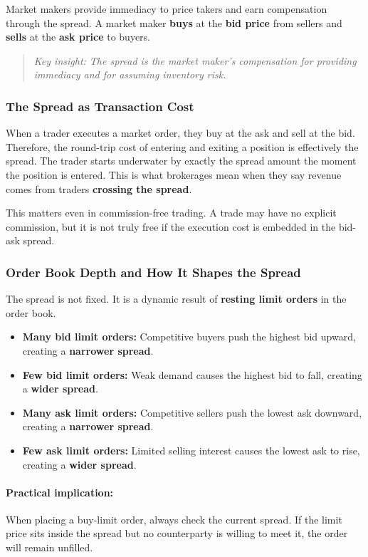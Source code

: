 \documentclass[12pt,openany]{book}
\begin{document}
Market makers provide immediacy to price takers and earn compensation through the spread. A market maker \textbf{buys} at the \textbf{bid price} from sellers and \textbf{sells} at the \textbf{ask price} to buyers.

\begin{quote}
\textit{Key insight: The spread is the market maker's compensation for providing immediacy and for assuming inventory risk.}
\end{quote}

\subsubsection{The Spread as Transaction Cost}
When a trader executes a market order, they buy at the ask and sell at the bid. Therefore, the round-trip cost of entering and exiting a position is effectively the spread. The trader starts underwater by exactly the spread amount the moment the position is entered. This is what brokerages mean when they say revenue comes from traders \textbf{crossing the spread}.

This matters even in commission-free trading. A trade may have no explicit commission, but it is not truly free if the execution cost is embedded in the bid-ask spread.

\subsubsection{Order Book Depth and How It Shapes the Spread}
The spread is not fixed. It is a dynamic result of \textbf{resting limit orders} in the order book.

\begin{itemize}[leftmargin=*]
    \item \textbf{Many bid limit orders:} Competitive buyers push the highest bid upward, creating a \textbf{narrower spread}.
    \item \textbf{Few bid limit orders:} Weak demand causes the highest bid to fall, creating a \textbf{wider spread}.
    \item \textbf{Many ask limit orders:} Competitive sellers push the lowest ask downward, creating a \textbf{narrower spread}.
    \item \textbf{Few ask limit orders:} Limited selling interest causes the lowest ask to rise, creating a \textbf{wider spread}.
\end{itemize}

\paragraph{Practical implication:} When placing a buy-limit order, always check the current spread. If the limit price sits inside the spread but no counterparty is willing to meet it, the order will remain unfilled.
\end{document}

